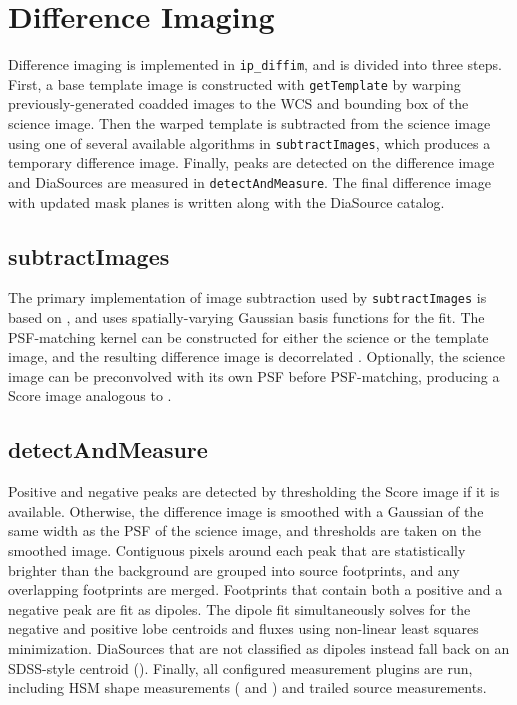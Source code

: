 \section{Difference Imaging}
\label{sec:diffim}

Difference imaging is implemented in \texttt{ip\_diffim}, and is divided into three steps.
First, a base template image is constructed with \texttt{getTemplate} by warping previously-generated coadded images to the WCS and bounding box of the science image.
Then the warped template is subtracted from the science image using one of several available algorithms in \texttt{subtractImages}, which produces a temporary difference image.
Finally, peaks are detected on the difference image and DiaSources are measured in \texttt{detectAndMeasure}.
The final difference image with updated mask planes is written along with the DiaSource catalog.

\subsection{subtractImages}
The primary implementation of image subtraction used by \texttt{subtractImages} is based on \cite{1998ApJ...503..325A}, and uses spatially-varying Gaussian basis functions for the fit.
The PSF-matching kernel can be constructed for either the science or the template image, and the resulting difference image is decorrelated \citet{DMTN-021}.
Optionally, the science image can be preconvolved with its own PSF before PSF-matching, producing a Score image analogous to \cite{Zackay_2016}.

\subsection{detectAndMeasure}
Positive and negative peaks are detected by thresholding the Score image if it is available.
Otherwise, the difference image is smoothed with a Gaussian of the same width as the PSF of the science image, and thresholds are taken on the smoothed image.
Contiguous pixels around each peak that are statistically brighter than the background are grouped into source footprints, and any overlapping footprints are merged.
Footprints that contain both a positive and a negative peak are fit as dipoles.
The dipole fit simultaneously solves for the negative and positive lobe centroids and fluxes using non-linear least squares minimization.
DiaSources that are not classified as dipoles instead fall back on an SDSS-style centroid (\cite{Pier_2003}).
Finally, all configured measurement plugins are run, including HSM shape measurements (\cite{2003MNRAS.343..459H} and \cite{2005MNRAS.361.1287M} ) and trailed source measurements.